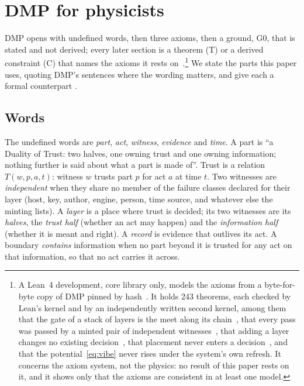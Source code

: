 \section{DMP for physicists}\label{sec:dmp}

DMP opens with undefined words, then three axioms, then a ground, G0, that is stated and not derived; every later section is a theorem
(T) or a derived constraint (C) that names the axioms it rests on~\cite{dmp}.\footnote{A Lean~4 development, core library only,
models the axioms from a byte-for-byte copy of DMP pinned by hash~\cite{lean4}. It holds 243 theorems, each checked by Lean's kernel and
by an independently written second kernel, among them that the gate of a stack of layers is the meet along its chain~\cite{denning},
that every pass was passed by a minted pair of independent witnesses~\cite{mr}, that adding a layer changes no existing
decision~\cite{ohearn}, that placement never enters a decision~\cite{gm}, and that the potential~\eqref{eq:vibe} never rises under the
system's own refresh. It concerns the axiom system, not the physics: no result of this paper rests on it, and it shows only that the
axioms are consistent in at least one model.} We state the parts this paper uses, quoting DMP's sentences
where the wording matters, and give each a formal counterpart \tagD.



\subsection{Words}

The undefined words are \emph{part}, \emph{act}, \emph{witness}, \emph{evidence} and \emph{time}. A part is ``a Duality of Trust: two halves,
one owning trust and one owning information; nothing further is said about what a part is made of''. Trust is a relation $T(w,p,a,t)$:
witness $w$ trusts part $p$ for act $a$ at time $t$. Two witnesses are \emph{independent} when they share no member of the failure classes
declared for their layer (host, key, author, engine, person, time source, and whatever else the minting lists). A \emph{layer} is a place
where trust is decided; its two witnesses are its \emph{halves}, the \emph{trust half} (whether an act may happen) and the
\emph{information half} (whether it is meant and right). A \emph{record} is evidence that outlives its act. A boundary \emph{contains}
information when no part beyond it is trusted for any act on that information, so that no act carries it across.


